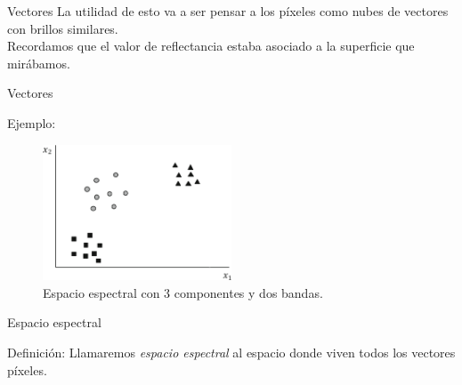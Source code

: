 \documentclass[handout]{beamer}
\begin{document}
\begin{frame}{Vectores}
  La utilidad de esto va a ser pensar a los píxeles como nubes de vectores con brillos similares.
  \\
  Recordamos que el valor de reflectancia estaba asociado a la superficie que mirábamos.
\end{frame}

\begin{frame}{Vectores}
  \begin{exampleblock}{Ejemplo:}
    \begin{figure}
      \includegraphics[width=0.5\textwidth]{imagenes/vector-3.png}
      \caption{Espacio espectral con 3 componentes y dos bandas. }
    \end{figure}
  \end{exampleblock}
\end{frame}

\begin{frame}{Espacio espectral}
  \begin{block}{Definición:}
    Llamaremos \emph{espacio espectral} al espacio donde viven todos los vectores píxeles.
  \end{block}
\end{frame}
\end{document}
